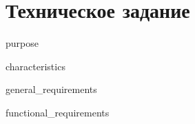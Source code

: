 \chapter{Техническое задание}

{purpose}

{characteristics}

{general_requirements}

{functional_requirements}
